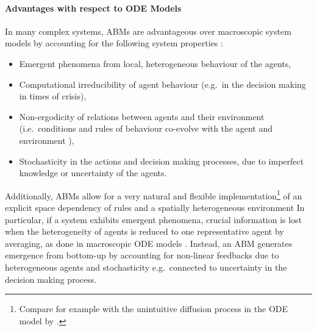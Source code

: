\paragraph{Advantages with respect to ODE Models}
In many complex systems, ABMs are advantageous over macroscopic system models by accounting for the following system properties \citep{Bookstaber2019}:
\begin{itemize}
	\item Emergent phenomena from local, heterogeneous behaviour of the agents,
	\item Computational irreducibility of agent behaviour (e.g.\ in the decision making in times of crisis),
	\item Non-ergodicity of relations between agents and their environment (i.e.\ conditions and rules of behaviour co-evolve with the agent and environment \citep{Kohler2000}),
	\item Stochasticity in the actions and decision making processes, due to imperfect knowledge or uncertainty of the agents. 
\end{itemize}
Additionally, ABMs allow for a very natural and flexible implementation\footnote{Compare for example with the unintuitive diffusion process in the ODE model by \citet{Basener2011}.} of an explicit space dependency of rules and a spatially heterogeneous environment
In particular, if a system exhibits emergent phenomena, crucial information is lost when the heterogeneity of agents is reduced to one representative agent by averaging, as done in macroscopic ODE models \citep{Bonabeau2002}.
Instead, an ABM generates emergence from bottom-up by accounting for non-linear feedbacks due to heterogeneous agents and stochasticity e.g.\ connected to uncertainty in the decision making process.



